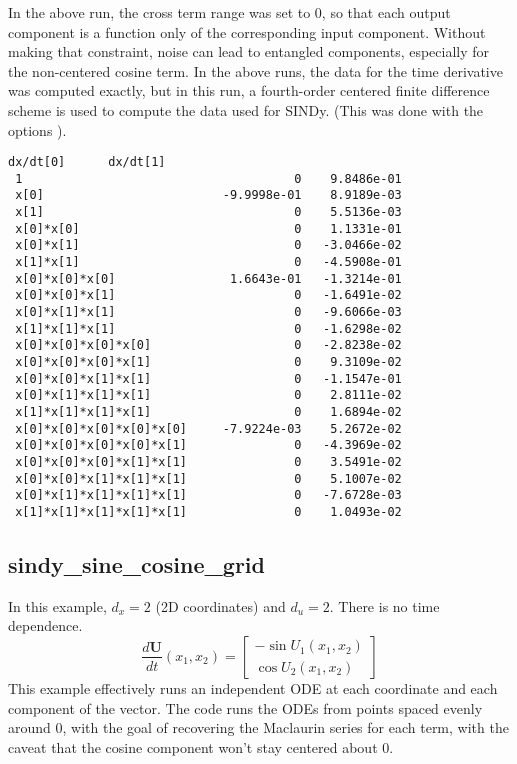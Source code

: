\documentclass{article}
\let\vec\mathbf
\def\lstinline#1{}%
\begin{document}
In the above run, the cross term range was set to 0, so that each output
component is a function only of the corresponding input component. Without
making that constraint, noise can lead to entangled components, especially for
the non-centered cosine term. In the above runs, the data for the time
derivative was computed exactly, but in this run, a fourth-order centered finite
difference scheme is used to compute the data used for SINDy. (This was done
with the options \lstinline{-sindy_cross_term_range -1 -fd_der 1}).
\begin{lstlisting}[language={}]
                                dx/dt[0]      dx/dt[1]
 1                                      0    9.8486e-01
 x[0]                         -9.9998e-01    8.9189e-03
 x[1]                                   0    5.5136e-03
 x[0]*x[0]                              0    1.1331e-01
 x[0]*x[1]                              0   -3.0466e-02
 x[1]*x[1]                              0   -4.5908e-01
 x[0]*x[0]*x[0]                1.6643e-01   -1.3214e-01
 x[0]*x[0]*x[1]                         0   -1.6491e-02
 x[0]*x[1]*x[1]                         0   -9.6066e-03
 x[1]*x[1]*x[1]                         0   -1.6298e-02
 x[0]*x[0]*x[0]*x[0]                    0   -2.8238e-02
 x[0]*x[0]*x[0]*x[1]                    0    9.3109e-02
 x[0]*x[0]*x[1]*x[1]                    0   -1.1547e-01
 x[0]*x[1]*x[1]*x[1]                    0    2.8111e-02
 x[1]*x[1]*x[1]*x[1]                    0    1.6894e-02
 x[0]*x[0]*x[0]*x[0]*x[0]     -7.9224e-03    5.2672e-02
 x[0]*x[0]*x[0]*x[0]*x[1]               0   -4.3969e-02
 x[0]*x[0]*x[0]*x[1]*x[1]               0    3.5491e-02
 x[0]*x[0]*x[1]*x[1]*x[1]               0    5.1007e-02
 x[0]*x[1]*x[1]*x[1]*x[1]               0   -7.6728e-03
 x[1]*x[1]*x[1]*x[1]*x[1]               0    1.0493e-02
\end{lstlisting}

\subsection{sindy\_sine\_cosine\_grid}
In this example, $d_x = 2$ (2D coordinates) and $d_u = 2$. There is no time dependence.
\begin{equation*}
\frac{d\vec{U}}{dt}(x_1, x_2) =
\begin{bmatrix}
-\sin U_1(x_1,x_2) \\ \cos U_2(x_1,x_2)
\end{bmatrix}
\end{equation*}
This example effectively runs an independent ODE at each coordinate and each
component of the vector. The code runs the ODEs from points spaced evenly around
0, with the goal of recovering the Maclaurin series for each term, with the
caveat that the cosine component won't stay centered about 0.
\end{document}

